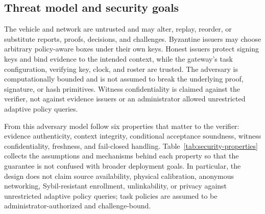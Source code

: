 \documentclass[preprint,review,12pt]{elsarticle}
\begin{document}
\subsection{Threat model and security goals}
The vehicle and network are untrusted and may alter, replay, reorder, or substitute reports, proofs, decisions, and challenges. Byzantine issuers may choose arbitrary policy-aware boxes under their own keys. Honest issuers protect signing keys and bind evidence to the intended context, while the gateway's task configuration, verifying key, clock, and roster are trusted. The adversary is computationally bounded and is not assumed to break the underlying proof, signature, or hash primitives. Witness confidentiality is claimed against the verifier, not against evidence issuers or an administrator allowed unrestricted adaptive policy queries.


From this adversary model follow six properties that matter to the verifier: evidence authenticity, context integrity, conditional acceptance soundness, witness confidentiality, freshness, and fail-closed handling. Table~\ref{tab:security-properties} collects the assumptions and mechanisms behind each property so that the guarantee is not confused with broader deployment goals. In particular, the design does not claim source availability, physical calibration, anonymous networking, Sybil-resistant enrollment, unlinkability, or privacy against unrestricted adaptive policy queries; task policies are assumed to be administrator-authorized and challenge-bound.
\end{document}
